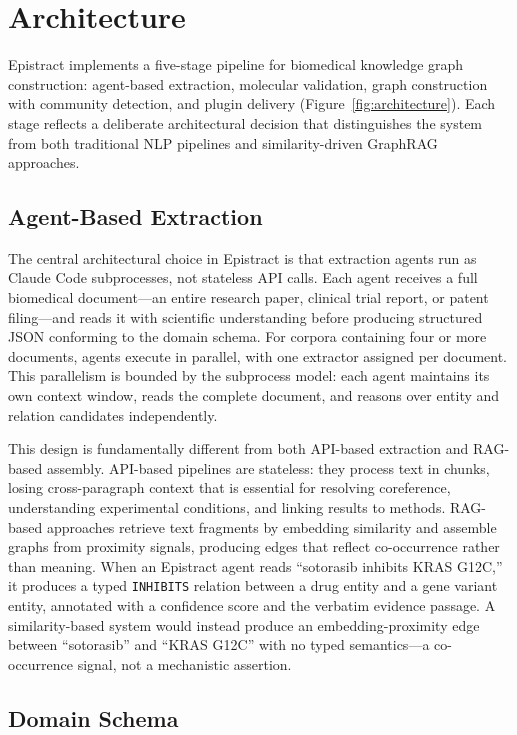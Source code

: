 \section{Architecture}
\label{sec:architecture}

Epistract implements a five-stage pipeline for biomedical knowledge graph construction: agent-based extraction, molecular validation, graph construction with community detection, and plugin delivery (Figure~\ref{fig:architecture}). Each stage reflects a deliberate architectural decision that distinguishes the system from both traditional NLP pipelines and similarity-driven GraphRAG approaches.

\subsection{Agent-Based Extraction}

The central architectural choice in Epistract is that extraction agents run as Claude Code subprocesses, not stateless API calls. Each agent receives a full biomedical document---an entire research paper, clinical trial report, or patent filing---and reads it with scientific understanding before producing structured JSON conforming to the domain schema. For corpora containing four or more documents, agents execute in parallel, with one extractor assigned per document. This parallelism is bounded by the subprocess model: each agent maintains its own context window, reads the complete document, and reasons over entity and relation candidates independently.

This design is fundamentally different from both API-based extraction and RAG-based assembly. API-based pipelines are stateless: they process text in chunks, losing cross-paragraph context that is essential for resolving coreference, understanding experimental conditions, and linking results to methods. RAG-based approaches retrieve text fragments by embedding similarity and assemble graphs from proximity signals, producing edges that reflect co-occurrence rather than meaning. When an Epistract agent reads ``sotorasib inhibits KRAS G12C,'' it produces a typed \texttt{INHIBITS} relation between a drug entity and a gene variant entity, annotated with a confidence score and the verbatim evidence passage. A similarity-based system would instead produce an embedding-proximity edge between ``sotorasib'' and ``KRAS G12C'' with no typed semantics---a co-occurrence signal, not a mechanistic assertion.

\subsection{Domain Schema}

